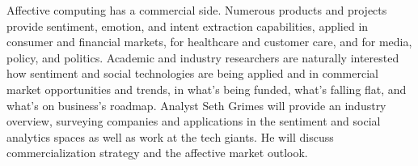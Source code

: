 Affective computing has a commercial side. Numerous products and projects provide sentiment, emotion, and intent extraction capabilities, applied in consumer and financial markets, for healthcare and customer care, and for media, policy, and politics. Academic and industry researchers are naturally interested how sentiment and social technologies are being applied and in commercial market opportunities and trends, in what's being funded, what's falling flat, and what's on business's roadmap. Analyst Seth Grimes will provide an industry overview, surveying companies and applications in the sentiment and social analytics spaces as well as work at the tech giants. He will discuss commercialization strategy and the affective market outlook.
